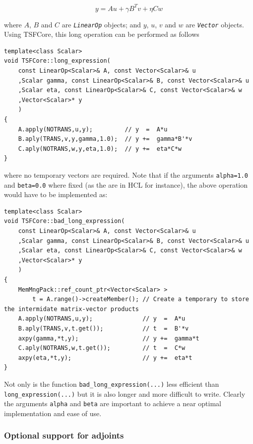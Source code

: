 \documentclass[10pt,fleqn]{article}
\begin{document}
\[
y = A u + \gamma B^T v + \eta C w
\]

where $A$, $B$ and $C$ are \texttt{\textit{LinearOp}} objects; and $y$,
$u$, $v$ and $w$ are \texttt{\textit{Vector}} objects.  Using TSFCore, this
long operation can be performed as follows

{\scriptsize\begin{verbatim}
template<class Scalar>
void TSFCore::long_expression(
    const LinearOp<Scalar>& A, const Vector<Scalar>& u
    ,Scalar gamma, const LinearOp<Scalar>& B, const Vector<Scalar>& u
    ,Scalar eta, const LinearOp<Scalar>& C, const Vector<Scalar>& w
    ,Vector<Scalar>* y
    )
{
    A.apply(NOTRANS,u,y);         // y  =  A*u
    B.aply(TRANS,v,y,gamma,1.0);  // y +=  gamma*B'*v
    C.aply(NOTRANS,w,y,eta,1.0);  // y +=  eta*C*w
}
\end{verbatim}}

where no temporary vectors are required.  Note that if the arguments
\texttt{alpha=1.0} and \texttt{beta=0.0} where fixed (as the are
in HCL for instance), the above operation would have to be implemented
as:

{\scriptsize\begin{verbatim}
template<class Scalar>
void TSFCore::bad_long_expression(
    const LinearOp<Scalar>& A, const Vector<Scalar>& u
    ,Scalar gamma, const LinearOp<Scalar>& B, const Vector<Scalar>& u
    ,Scalar eta, const LinearOp<Scalar>& C, const Vector<Scalar>& w
    ,Vector<Scalar>* y
    )
{
    MemMngPack::ref_count_ptr<Vector<Scalar> >
        t = A.range()->createMember(); // Create a temporary to store the intermidate matrix-vector products
    A.apply(NOTRANS,u,y);              // y  =  A*u
    B.aply(TRANS,v,t.get());           // t  =  B'*v
    axpy(gamma,*t,y);                  // y +=  gamma*t
    C.aply(NOTRANS,w,t.get());         // t  =  C*w
    axpy(eta,*t,y);                    // y +=  eta*t
}
\end{verbatim}}

Not only is the function \texttt{bad\_long\_expression(...)} less
efficient than \texttt{long\_expression(...)} but it is also longer
and more difficult to write.  Clearly the arguments \texttt{alpha} and
\texttt{beta} are important to achieve a near optimal implementation
and ease of use.

%
\subsubsection{Optional support for adjoints}
\label{tsfcore:sec:linear_op_adjoints}
%
\end{document}
